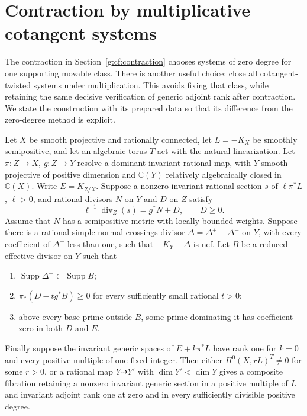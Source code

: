 \section{Contraction by multiplicative cotangent systems}
\label{g:multiplicative}

The contraction in Section~\ref{g:cf:contraction} chooses systems of
zero degree for one supporting movable class. There is another useful
choice: close all cotangent-twisted systems under multiplication.
This avoids fixing that class, while retaining the same decisive
verification of generic adjoint rank after contraction. We state the
construction with its prepared data so that its difference from the
zero-degree method is explicit.

\begin{proposition}\label{g:multiplicative-contraction}
Let $X$ be smooth projective and rationally connected, let
$L=-K_X$ be smoothly semipositive, and let an algebraic torus $T$ act
with the natural linearization. Let
$\pi:Z\to X$, $g:Z\to Y$ resolve a dominant invariant rational map,
with $Y$ smooth projective of positive dimension and
$\mathbb C(Y)$ relatively algebraically closed in $\mathbb C(X)$.
Write $E=K_{Z/X}$. Suppose a nonzero invariant rational section $s$ of
$\ell\pi^*L$, $\ell>0$, and rational divisors $N$ on $Y$ and $D$ on
$Z$ satisfy
\[
 \ell^{-1}\operatorname{div}_Z(s)=g^*N+D,\qquad D\geq0.
\]
Assume that $N$ has a semipositive metric with locally bounded weights.
Suppose there is a rational simple normal crossings divisor
$\Delta=\Delta^+-\Delta^-$ on $Y$, with every coefficient of
$\Delta^+$ less than one, such that $-K_Y-\Delta$ is nef.
Let $B$ be a reduced effective divisor on $Y$ such that
\begin{enumerate}[label=(\roman*)]
\item $\operatorname{Supp}\Delta^-\subset\operatorname{Supp}B$;
\item $\pi_*(D-tg^*B)\geq0$ for every sufficiently small rational $t>0$;
\item above every base prime outside $B$, some prime dominating it has
coefficient zero in both $D$ and $E$.
\end{enumerate}
Finally suppose the invariant generic spaces of
$E+k\pi^*L$ have rank one for $k=0$ and every positive multiple of
one fixed integer.
Then either $H^0(X,rL)^T\ne0$ for some $r>0$, or a rational map
$Y\dashrightarrow Y'$ with $\dim Y'<\dim Y$ gives a composite
fibration retaining a nonzero invariant generic section in a positive
multiple of $L$ and invariant adjoint rank one at zero and in every
sufficiently divisible positive degree.
\end{proposition}

